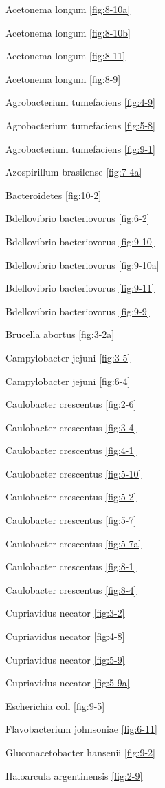 \documentclass[]{tufte-book}
\begin{document}
Acetonema longum \ref{fig:8-10a}

Acetonema longum \ref{fig:8-10b}

Acetonema longum \ref{fig:8-11}

Acetonema longum \ref{fig:8-9}

Agrobacterium tumefaciens \ref{fig:4-9}

Agrobacterium tumefaciens \ref{fig:5-8}

Agrobacterium tumefaciens \ref{fig:9-1}

Azospirillum brasilense \ref{fig:7-4a}

Bacteroidetes \ref{fig:10-2}

Bdellovibrio bacteriovorus \ref{fig:6-2}

Bdellovibrio bacteriovorus \ref{fig:9-10}

Bdellovibrio bacteriovorus \ref{fig:9-10a}

Bdellovibrio bacteriovorus \ref{fig:9-11}

Bdellovibrio bacteriovorus \ref{fig:9-9}

Brucella abortus \ref{fig:3-2a}

Campylobacter jejuni \ref{fig:3-5}

Campylobacter jejuni \ref{fig:6-4}

Caulobacter crescentus \ref{fig:2-6}

Caulobacter crescentus \ref{fig:3-4}

Caulobacter crescentus \ref{fig:4-1}

Caulobacter crescentus \ref{fig:5-10}

Caulobacter crescentus \ref{fig:5-2}

Caulobacter crescentus \ref{fig:5-7}

Caulobacter crescentus \ref{fig:5-7a}

Caulobacter crescentus \ref{fig:8-1}

Caulobacter crescentus \ref{fig:8-4}

Cupriavidus necator \ref{fig:3-2}

Cupriavidus necator \ref{fig:4-8}

Cupriavidus necator \ref{fig:5-9}

Cupriavidus necator \ref{fig:5-9a}

Escherichia coli \ref{fig:9-5}

Flavobacterium johnsoniae \ref{fig:6-11}

Gluconacetobacter hansenii \ref{fig:9-2}

Haloarcula argentinensis \ref{fig:2-9}
\end{document}
